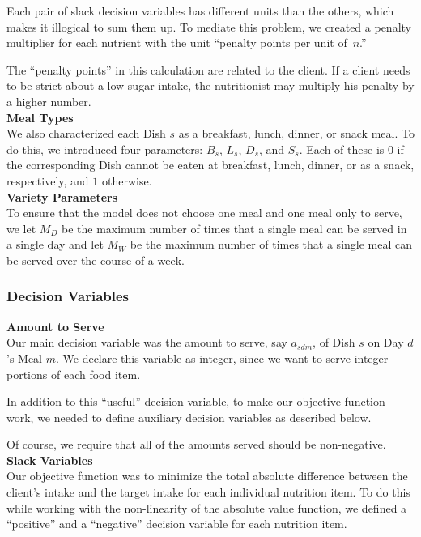 \documentclass[twoside]{article}
\begin{document}
Each pair of slack decision variables has different units than the others, which makes it illogical to sum them up. To mediate this problem, we created a penalty multiplier for each nutrient with the unit ``penalty points per unit of~$n$.''

The ``penalty points'' in this calculation are related to the client. If a client needs to be strict about a low sugar intake, the nutritionist may multiply his penalty by a higher number.\\[.1in]
\textbf{Meal Types}\\[.1in]
We also characterized each Dish $s$ as a breakfast, lunch, dinner, or snack meal. To do this, we introduced four parameters: $B_s$, $L_s$, $D_s$, and $S_s$. Each of these is $0$ if the corresponding Dish cannot be eaten at breakfast, lunch, dinner, or as a snack, respectively, and $1$ otherwise.\\[.1in]
\textbf{Variety Parameters}\\[.1in]
To ensure that the model does not choose one meal and one meal only to serve, we let $M_D$ be the maximum number of times that a single meal can be served in a single day and let $M_W$ be the maximum number of times that a single meal can be served over the course of a week.

\subsubsection{Decision Variables}
\textbf{Amount to Serve}\\[.1in]
\noindent Our main decision variable was the amount to serve, say $a_{sdm}$, of Dish $s$ on Day $d$'s Meal $m$. We declare this variable as integer, since we want to serve integer portions of each food item.

In addition to this ``useful'' decision variable, to make our objective function work, we needed to define auxiliary decision variables as described below.

Of course, we require that all of the amounts served should be non-negative.\\[.1in]
\textbf{Slack Variables}\\[.1in]
\label{sec:slack}
\noindent Our objective function was to minimize the total absolute difference between the client's intake and the target intake for each individual nutrition item. To do this while working with the non-linearity of the absolute value function, we defined a ``positive'' and a ``negative'' decision variable for each nutrition item. 
\end{document}
